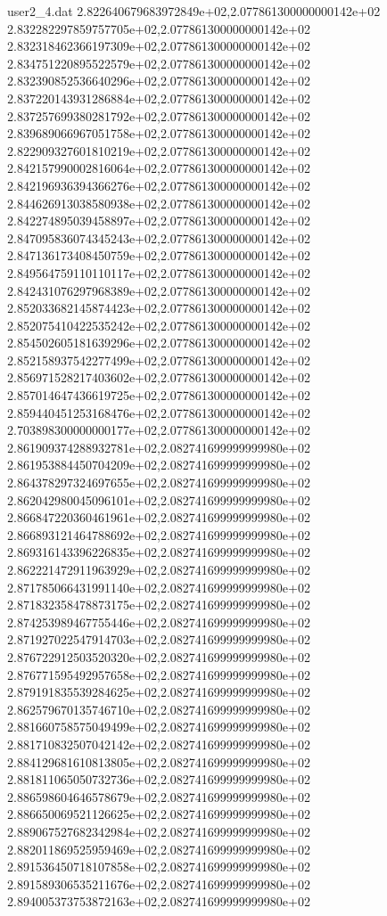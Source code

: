 \begin{filecontents}{user2_4.dat}
2.822640679683972849e+02,2.077861300000000142e+02
2.832282297859757705e+02,2.077861300000000142e+02
2.832318462366197309e+02,2.077861300000000142e+02
2.834751220895522579e+02,2.077861300000000142e+02
2.832390852536640296e+02,2.077861300000000142e+02
2.837220143931286884e+02,2.077861300000000142e+02
2.837257699380281792e+02,2.077861300000000142e+02
2.839689066967051758e+02,2.077861300000000142e+02
2.822909327601810219e+02,2.077861300000000142e+02
2.842157990002816064e+02,2.077861300000000142e+02
2.842196936394366276e+02,2.077861300000000142e+02
2.844626913038580938e+02,2.077861300000000142e+02
2.842274895039458897e+02,2.077861300000000142e+02
2.847095836074345243e+02,2.077861300000000142e+02
2.847136173408450759e+02,2.077861300000000142e+02
2.849564759110110117e+02,2.077861300000000142e+02
2.842431076297968389e+02,2.077861300000000142e+02
2.852033682145874423e+02,2.077861300000000142e+02
2.852075410422535242e+02,2.077861300000000142e+02
2.854502605181639296e+02,2.077861300000000142e+02
2.852158937542277499e+02,2.077861300000000142e+02
2.856971528217403602e+02,2.077861300000000142e+02
2.857014647436619725e+02,2.077861300000000142e+02
2.859440451253168476e+02,2.077861300000000142e+02
2.703898300000000177e+02,2.077861300000000142e+02
2.861909374288932781e+02,2.082741699999999980e+02
2.861953884450704209e+02,2.082741699999999980e+02
2.864378297324697655e+02,2.082741699999999980e+02
2.862042980045096101e+02,2.082741699999999980e+02
2.866847220360461961e+02,2.082741699999999980e+02
2.866893121464788692e+02,2.082741699999999980e+02
2.869316143396226835e+02,2.082741699999999980e+02
2.862221472911963929e+02,2.082741699999999980e+02
2.871785066431991140e+02,2.082741699999999980e+02
2.871832358478873175e+02,2.082741699999999980e+02
2.874253989467755446e+02,2.082741699999999980e+02
2.871927022547914703e+02,2.082741699999999980e+02
2.876722912503520320e+02,2.082741699999999980e+02
2.876771595492957658e+02,2.082741699999999980e+02
2.879191835539284625e+02,2.082741699999999980e+02
2.862579670135746710e+02,2.082741699999999980e+02
2.881660758575049499e+02,2.082741699999999980e+02
2.881710832507042142e+02,2.082741699999999980e+02
2.884129681610813805e+02,2.082741699999999980e+02
2.881811065050732736e+02,2.082741699999999980e+02
2.886598604646578679e+02,2.082741699999999980e+02
2.886650069521126625e+02,2.082741699999999980e+02
2.889067527682342984e+02,2.082741699999999980e+02
2.882011869525959469e+02,2.082741699999999980e+02
2.891536450718107858e+02,2.082741699999999980e+02
2.891589306535211676e+02,2.082741699999999980e+02
2.894005373753872163e+02,2.082741699999999980e+02

\end{filecontents}
